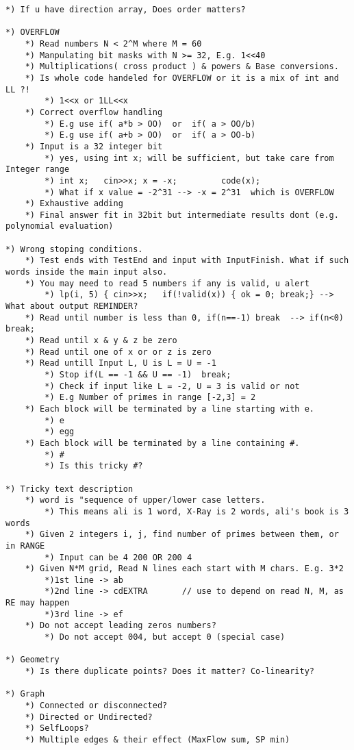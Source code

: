 \documentclass[12pt,a4paper,onesided]{article}
\begin{document}
\begin{multicols}{3}
\begin{lstlisting}
*) If u have direction array, Does order matters?
			
*) OVERFLOW
    *) Read numbers N < 2^M where M = 60
    *) Manpulating bit masks with N >= 32, E.g. 1<<40
    *) Multiplications( cross product ) & powers & Base conversions.
    *) Is whole code handeled for OVERFLOW or it is a mix of int and LL ?!
        *) 1<<x or 1LL<<x
    *) Correct overflow handling
        *) E.g use if( a*b > OO)  or  if( a > OO/b)
        *) E.g use if( a+b > OO)  or  if( a > OO-b)
    *) Input is a 32 integer bit
        *) yes, using int x; will be sufficient, but take care from Integer range
        *) int x;	cin>>x;	x = -x;			code(x);
        *) What if x value = -2^31 --> -x = 2^31  which is OVERFLOW
    *) Exhaustive adding
    *) Final answer fit in 32bit but intermediate results dont (e.g. polynomial evaluation)
	
*) Wrong stoping conditions.
    *) Test ends with TestEnd and input with InputFinish. What if such words inside the main input also.
    *) You may need to read 5 numbers if any is valid, u alert
        *) lp(i, 5) { cin>>x;	if(!valid(x)) { ok = 0; break;} --> What about output REMINDER?
    *) Read until number is less than 0, if(n==-1) break  --> if(n<0) break;
    *) Read until x & y & z be zero
    *) Read until one of x or or z is zero
    *) Read untill Input L, U is L = U = -1
        *) Stop if(L == -1 && U == -1)	break;
        *) Check if input like L = -2, U = 3 is valid or not
        *) E.g Number of primes in range [-2,3] = 2
    *) Each block will be terminated by a line starting with e.
        *) e
        *) egg
    *) Each block will be terminated by a line containing #.
        *) #
        *) Is this tricky #?
			
*) Tricky text description
    *) word is "sequence of upper/lower case letters.
        *) This means ali is 1 word, X-Ray is 2 words, ali's book is 3 words
    *) Given 2 integers i, j, find number of primes between them, or in RANGE
        *) Input can be 4 200 OR 200 4
    *) Given N*M grid, Read N lines each start with M chars. E.g. 3*2
        *)1st line -> ab
        *)2nd line -> cdEXTRA		// use to depend on read N, M, as RE may happen
        *)3rd line -> ef				
    *) Do not accept leading zeros numbers?
        *) Do not accept 004, but accept 0 (special case)  		
	
*) Geometry
    *) Is there duplicate points? Does it matter? Co-linearity?
		
*) Graph
    *) Connected or disconnected?
    *) Directed or Undirected?
    *) SelfLoops?
    *) Multiple edges & their effect (MaxFlow sum, SP min)
		

\end{lstlisting}
\end{multicols}
\end{document}
